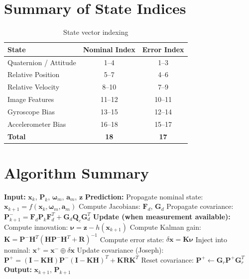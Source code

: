 \documentclass[11pt,a4paper]{article}
\newcommand{\I}{\mathbf{I}}
\begin{document}
\section{Summary of State Indices}

\begin{table}[h]
\centering
\begin{tabular}{lcc}
\toprule
State & Nominal Index & Error Index \\
\midrule
Quaternion / Attitude & 1--4 & 1--3 \\
Relative Position & 5--7 & 4--6 \\
Relative Velocity & 8--10 & 7--9 \\
Image Features & 11--12 & 10--11 \\
Gyroscope Bias & 13--15 & 12--14 \\
Accelerometer Bias & 16--18 & 15--17 \\
\midrule
\textbf{Total} & \textbf{18} & \textbf{17} \\
\bottomrule
\end{tabular}
\caption{State vector indexing}
\end{table}

\section{Algorithm Summary}

\begin{algorithm}[H]
\caption{ESKF Prediction and Update}
\begin{algorithmic}[1]
\State \textbf{Input:} $\mathbf{x}_k$, $\mathbf{P}_k$, $\bm{\omega}_m$, $\mathbf{a}_m$, $\mathbf{z}$
\State \textbf{Prediction:}
\State \quad Propagate nominal state: $\mathbf{x}_{k+1} = f(\mathbf{x}_k, \bm{\omega}_m, \mathbf{a}_m)$
\State \quad Compute Jacobians: $\mathbf{F}_d$, $\mathbf{G}_d$
\State \quad Propagate covariance: $\mathbf{P}_{k+1}^- = \mathbf{F}_d \mathbf{P}_k \mathbf{F}_d^T + \mathbf{G}_d \mathbf{Q}_c \mathbf{G}_d^T$
\State \textbf{Update (when measurement available):}
\State \quad Compute innovation: $\bm{\nu} = \mathbf{z} - h(\mathbf{x}_{k+1})$
\State \quad Compute Kalman gain: $\mathbf{K} = \mathbf{P}^- \mathbf{H}^T (\mathbf{H}\mathbf{P}^-\mathbf{H}^T + \mathbf{R})^{-1}$
\State \quad Compute error state: $\delta\mathbf{x} = \mathbf{K} \bm{\nu}$
\State \quad Inject into nominal: $\mathbf{x}^+ = \mathbf{x}^- \oplus \delta\mathbf{x}$
\State \quad Update covariance (Joseph): $\mathbf{P}^+ = (\I-\mathbf{K}\mathbf{H})\mathbf{P}^-(\I-\mathbf{K}\mathbf{H})^T + \mathbf{K}\mathbf{R}\mathbf{K}^T$
\State \quad Reset covariance: $\mathbf{P}^+ \leftarrow \mathbf{G}_r \mathbf{P}^+ \mathbf{G}_r^T$
\State \textbf{Output:} $\mathbf{x}_{k+1}$, $\mathbf{P}_{k+1}$
\end{algorithmic}
\end{algorithm}
\end{document}

